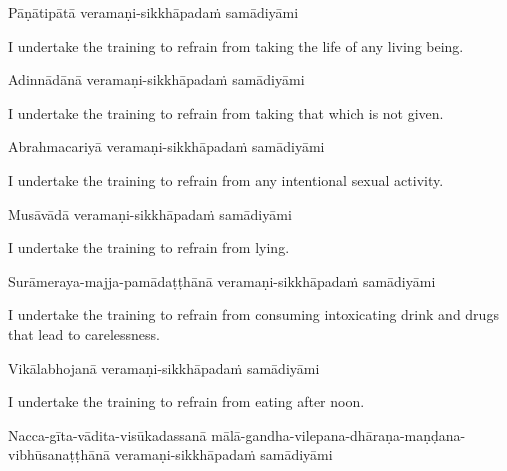 Pāṇātipātā veramaṇi-sikkhāpadaṁ samādiyāmi

\begin{english-hang}
  I undertake the training to refrain from taking the life of any living being.
\end{english-hang}

Adinnādānā veramaṇi-sikkhāpadaṁ samādiyāmi

\begin{english-hang}
  I undertake the training to refrain from taking that which is not given.
\end{english-hang}

Abrahmacariyā veramaṇi-sikkhāpadaṁ samādiyāmi

\begin{english-hang}
  I undertake the training to refrain from any intentional sexual activity.
\end{english-hang}

Musāvādā veramaṇi-sikkhāpadaṁ samādiyāmi

\begin{english}
  I undertake the training to refrain from lying.
\end{english}

\begin{pali-hang}
  Surāmeraya-majja-pamādaṭṭhānā veramaṇi-sikkhāpadaṁ samādiyāmi
\end{pali-hang}

\begin{english-hang}
  I undertake the training to refrain from consuming intoxicating drink and drugs that\makeatletter\hyperlink{endnote141-appendix}\makeatother
  lead to carelessness.
\end{english-hang}

Vikālabhojanā veramaṇi-sikkhāpadaṁ samādiyāmi

\begin{english}
  I undertake the training to refrain from eating after noon.\makeatletter\hyperlink{endnote142-appendix}\makeatother
\end{english}

\begin{pali-hang}
  Nacca-gīta-vādita-visūkadassanā mālā-gandha-vilepana-dhāraṇa-maṇḍana-vibhūsanaṭṭhānā veramaṇi-sikkhāpadaṁ samādiyāmi
\end{pali-hang}

